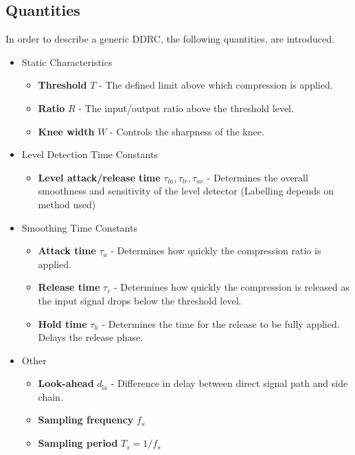 \documentclass[../main2.tex]{subfiles}
\begin{document}
\subsection{Quantities}\label{theory_definitions}
In order to describe a generic DDRC, the following quantities, are introduced.
\begin{itemize}
\item{Static Characteristics}
	\begin{itemize}
	\item \textbf{Threshold} $T$ - The defined limit above which compression is applied.
	\item \textbf{Ratio} $R$ - The input/output ratio above the threshold level.
	\item \textbf{Knee width}  $W$ - Controls the sharpness of the knee.
\end{itemize}
\item{Level Detection Time Constants}
	\begin{itemize}
	\item \textbf{Level attack/release time} $\tau_{la}, \tau_{lr}, \tau_{av}$ - Determines the overall smoothness and sensitivity of the level detector (Labelling depends on method used)
	\end{itemize}
\item{Smoothing Time Constants}
	\begin{itemize}
	\item \textbf{Attack time} $\tau_{a}$ - Determines how quickly the compression ratio is applied.
	\item \textbf{Release time} $\tau_{r}$ - Determines how quickly the compression is released as the input signal drops below the threshold level.
	\item \textbf{Hold time} $\tau_h$ - Determines the time for the release to be fully applied. Delays the release phase.
	\end{itemize}
\item{Other}
	\begin{itemize}
	\item \textbf{Look-ahead} $d_\text{la}$ - Difference in delay between direct signal path and side chain. 
	\item \textbf{Sampling frequency} $f_s$
	\item \textbf{Sampling period} $T_s = 1/f_s$
	\end{itemize}
\end{itemize}
\end{document}
